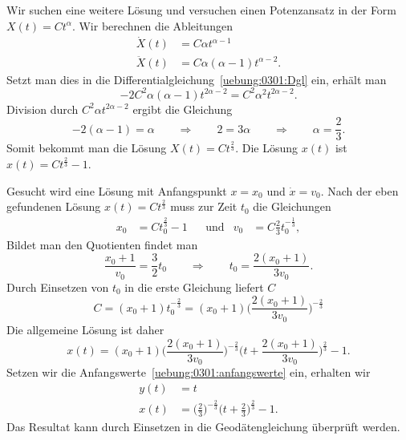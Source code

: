 \begin{loesung}
\begin{teilaufgaben}
Wir suchen eine weitere Lösung und versuchen einen Potenzansatz
in der Form $X(t)=Ct^\alpha$.
Wir berechnen die Ableitungen
\begin{align*}
\dot  X(t) &= C\alpha t^{\alpha - 1}
\\
\ddot X(t) &= C\alpha(\alpha - 1) t^{\alpha - 2}.
\end{align*}
Setzt man dies in die Differentialgleichung~\eqref{uebung:0301:Dgl}
ein, erhält man
\[
-2C^2\alpha(\alpha - 1) t^{2\alpha-2} = C^2\alpha^2 t^{2\alpha - 2}.
\]
Division durch $C^2\alpha t^{2\alpha-2}$ ergibt die Gleichung
\[
-2(\alpha-1)=\alpha
\qquad\Rightarrow\qquad
2=3\alpha
\qquad\Rightarrow\qquad
\alpha=\frac23.
\]
Somit bekommt man die Lösung $X(t)=Ct^{\frac23}$.
Die Lösung $x(t)$ ist $x(t)=Ct^{\frac23}-1$.
\item
Gesucht wird eine Lösung mit Anfangspunkt $x=x_0$ und $\dot x=v_0$.
Nach der eben gefundenen Lösung $x(t)=Ct^{\frac23}$ muss zur Zeit $t_0$ die
Gleichungen
\begin{equation}
\begin{aligned}
x_0&=Ct_0^{\frac23}-1&&\text{und}& v_0 &= C\frac23 t_0^{-\frac13},
\end{aligned}
\end{equation}
Bildet man den Quotienten findet man
\[
\frac{x_0+1}{v_0}
=
\frac32t_0
\qquad\Rightarrow\qquad
t_0=\frac{2(x_0+1)}{3v_0}.
\]
Durch Einsetzen von $t_0$ in die erste Gleichung liefert $C$
\[
C
=
(x_0+1)t_0^{-\frac23}
=
(x_0+1)\biggl(\frac{2(x_0+1)}{3v_0}\biggr)^{-\frac23}
\]
Die allgemeine Lösung ist daher
\[
x(t)
=
(x_0+1)\biggl(\frac{2(x_0+1)}{3v_0}\biggr)^{-\frac23}
\biggl( t + \frac{2(x_0+1)}{3v_0} \biggr)^{\frac23} - 1.
\]
Setzen wir die Anfangswerte~\eqref{uebung:0301:anfangswerte} ein, erhalten
wir
\begin{align*}
y(t)&=t\\
x(t)&=\biggl(\frac{2}{3}\biggr)^{-\frac23}\biggl(t + \frac23\biggr)^{\frac23} - 1.
\end{align*}
Das Resultat kann durch Einsetzen in die Geodätengleichung überprüft werden.
\qedhere
\end{teilaufgaben}
\end{loesung}

